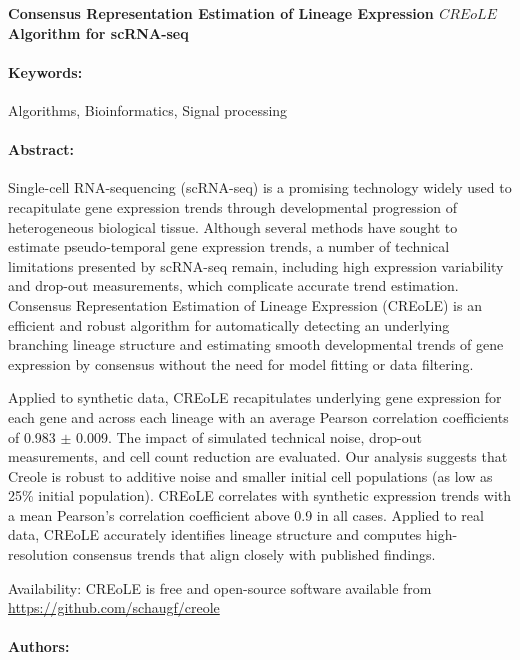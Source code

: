 \noindent
\large {\bf Consensus Representation Estimation of Lineage Expression \(CREoLE\) Algorithm for scRNA-seq} 


\normalsize 


\noindent \paragraph{Keywords:} Algorithms, Bioinformatics, Signal processing

\noindent \paragraph{Abstract:} 
Single-cell RNA-sequencing (scRNA-seq) is a promising technology widely used to
recapitulate gene expression trends through developmental progression of heterogeneous biological
tissue. Although several methods have sought to estimate pseudo-temporal gene expression trends, a
number of technical limitations presented by scRNA-seq remain, including high expression variability
and drop-out measurements, which complicate accurate trend estimation. Consensus Representation
Estimation of Lineage Expression (CREoLE) is an efficient and robust algorithm for automatically detecting
an underlying branching lineage structure and estimating smooth developmental trends of gene expression
by consensus without the need for model fitting or data filtering.

 Applied to synthetic data, CREoLE recapitulates underlying gene expression for each gene and
across each lineage with an average Pearson correlation coefficients of 0.983 $\pm$ 0.009. The impact of
simulated technical noise, drop-out measurements, and cell count reduction are evaluated. Our analysis
suggests that Creole is robust to additive noise and smaller initial cell populations (as low as 25\%
initial population). CREoLE correlates with synthetic expression trends with a mean Pearson’s correlation
coefficient above 0.9 in all cases. Applied to real data, CREoLE accurately identifies lineage structure and
computes high-resolution consensus trends that align closely with published findings.

Availability: CREoLE is free and open-source software available from \url{https://github.com/schaugf/creole}


\noindent \paragraph{Authors:} 


